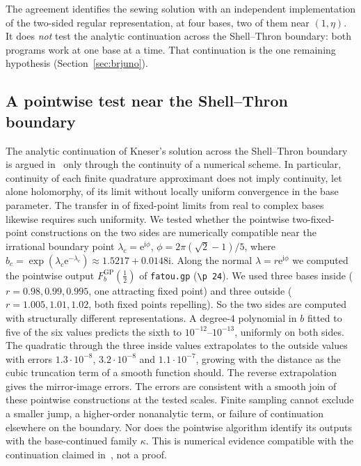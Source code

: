\documentclass[11pt,a4paper]{article}
\theoremstyle{definition}
\newcommand{\eee}{\mathrm{e}}
\newcommand{\ii}{\mathrm{i}}
\begin{document}
The agreement identifies the sewing solution with an independent implementation
of the two-sided regular representation, at four bases, two of them near
$(1,\eta)$.  It does \emph{not} test the analytic continuation across the
Shell--Thron boundary: both programs work at one base at a time.  That
continuation is the one remaining hypothesis (Section~\ref{sec:brjuno}).

\subsection{A pointwise test near the Shell--Thron boundary}\label{sec:bndtest}
The analytic continuation of Kneser's solution across the Shell--Thron boundary is
argued in~\cite[\S5]{Paulsen2019} only through the continuity of a numerical
scheme.  In particular, continuity of each finite quadrature approximant
does not imply continuity, let alone holomorphy, of its limit without
locally uniform convergence in the base parameter.  The transfer in
\cite[Prop.~3]{Paulsen2019} of fixed-point limits from real to complex
bases likewise requires such uniformity.  We tested whether the pointwise
two-fixed-point constructions on the two sides are numerically compatible
near the irrational boundary point
$\lambda_c=\eee^{\ii\phi}$, $\phi=2\pi(\sqrt2-1)/5$, where
$b_c=\exp(\lambda_c\eee^{-\lambda_c})\approx1.5217+0.0148\ii$.  Along the normal
$\lambda=r\eee^{\ii\phi}$ we computed the pointwise output
$F_b^{\mathrm{GP}}(\tfrac12)$ of \texttt{fatou.gp}
(\texttt{\textbackslash p 24}).  We used three bases inside
($r=0.98,0.99,0.995$, one attracting fixed point) and three outside
($r=1.005,1.01,1.02$, both fixed points repelling).  So the two sides are
computed with structurally different representations.  A degree-$4$ polynomial
in $b$ fitted to five of the six values predicts the sixth to
$10^{-12}$--$10^{-13}$, uniformly on both sides.  The quadratic through the three
inside values extrapolates to the outside values with errors
$1.3\cdot10^{-8}$, $3.2\cdot10^{-8}$ and $1.1\cdot10^{-7}$, growing with the
distance as the cubic truncation term of a smooth function should.  The reverse
extrapolation gives the mirror-image errors.  The errors are consistent with
a smooth join of these pointwise constructions at the tested scales.
Finite sampling cannot exclude a smaller
jump, a higher-order nonanalytic term, or failure of continuation elsewhere
on the boundary.  Nor does the pointwise algorithm identify its outputs
with the base-continued family $\kappa$.  This is numerical evidence
compatible with the continuation claimed in~\cite{Paulsen2019}, not a proof.
\end{document}
